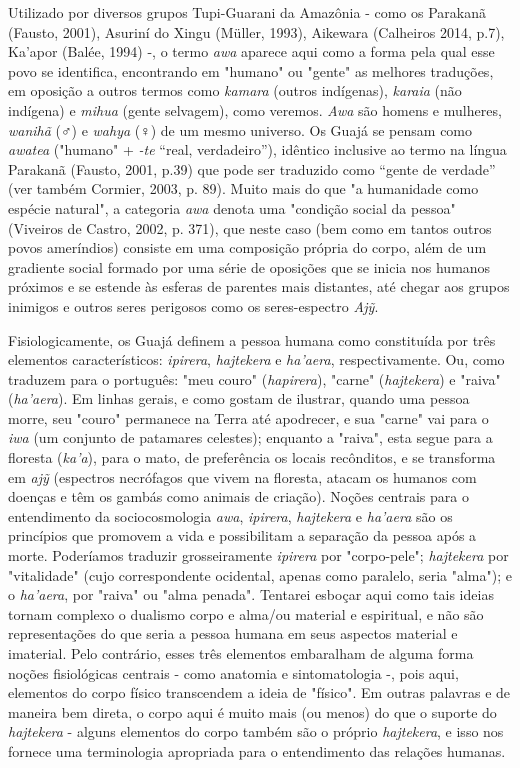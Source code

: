 Utilizado por diversos grupos Tupi-Guarani da Amazônia - como os
Parakanã (Fausto, 2001), Asuriní do Xingu (Müller, 1993), Aikewara
(Calheiros 2014, p.7), Ka'apor (Balée, 1994) -, o termo \emph{awa}
aparece aqui como a forma pela qual esse povo se identifica, encontrando
em "humano" ou "gente" as melhores traduções, em oposição a outros
termos como \emph{kamara} (outros indígenas), \emph{karaia} (não
indígena) e \emph{mihua} (gente selvagem), como veremos. \emph{Awa} são
homens e mulheres, \emph{wanihã} (\textbf{♂}) e \emph{wahya} (♀) de um
mesmo universo. Os Guajá se pensam como \emph{awatea} ("humano" +
\emph{-te} ``real, verdadeiro''), idêntico inclusive ao termo na língua
Parakanã (Fausto, 2001, p.39) que pode ser traduzido como ``gente de
verdade'' (ver também Cormier, 2003, p. 89). Muito mais do que "a
humanidade como espécie natural", a categoria \emph{awa} denota uma
"condição social da pessoa" (Viveiros de Castro, 2002, p. 371), que
neste caso (bem como em tantos outros povos ameríndios) consiste em uma
composição própria do corpo, além de um gradiente social formado por uma
série de oposições que se inicia nos humanos próximos e se estende às
esferas de parentes mais distantes, até chegar aos grupos inimigos e
outros seres perigosos como os seres-espectro \emph{Ajỹ}.

Fisiologicamente, os Guajá definem a pessoa humana como constituída por
três elementos característicos: \emph{ipirera}, \emph{hajtekera} e
\emph{ha'aera}, respectivamente. Ou, como traduzem para o português:
"meu couro" (\emph{hapirera}), "carne" (\emph{hajtekera}) e "raiva"
(\emph{ha'aera}). Em linhas gerais, e como gostam de ilustrar, quando
uma pessoa morre, seu "couro" permanece na Terra até apodrecer, e sua
"carne" vai para o \emph{iwa} (um conjunto de patamares celestes);
enquanto a "raiva", esta segue para a floresta (\emph{ka'a}), para o
mato, de preferência os locais recônditos, e se transforma em \emph{ajỹ}
(espectros necrófagos que vivem na floresta, atacam os humanos com
doenças e têm os gambás como animais de criação). Noções centrais para o
entendimento da sociocosmologia \emph{awa}, \emph{ipirera},
\emph{hajtekera} e \emph{ha'aera} são os princípios que promovem a vida
e possibilitam a separação da pessoa após a morte. Poderíamos traduzir
grosseiramente \emph{ipirera} por "corpo-pele"; \emph{hajtekera} por
"vitalidade" (cujo correspondente ocidental, apenas como paralelo, seria
"alma"); e o \emph{ha'aera}, por "raiva" ou "alma penada". Tentarei
esboçar aqui como tais ideias tornam complexo o dualismo corpo e alma/ou
material e espiritual, e não são representações do que seria a pessoa
humana em seus aspectos material e imaterial. Pelo contrário, esses três
elementos embaralham de alguma forma noções fisiológicas centrais - como
anatomia e sintomatologia -, pois aqui, elementos do corpo físico
transcendem a ideia de "físico". Em outras palavras e de maneira bem
direta, o corpo aqui é muito mais (ou menos) do que o suporte do
\emph{hajtekera} - alguns elementos do corpo também são o próprio
\emph{hajtekera}, e isso nos fornece uma terminologia apropriada para o
entendimento das relações humanas.

